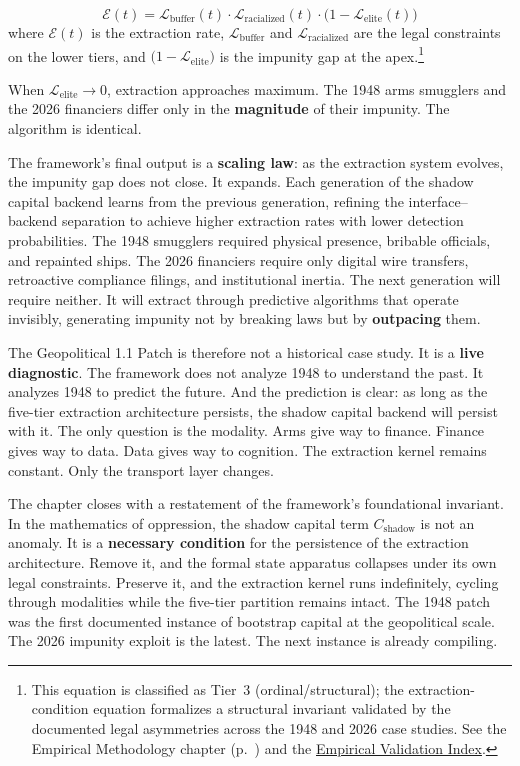 \begin{equation}\label{eq:gp16-extraction-condition}
\mathcal{E}(t) = \mathcal{L}_{\text{buffer}}(t) \cdot \mathcal{L}_{\text{racialized}}(t) \cdot \bigl(1 - \mathcal{L}_{\text{elite}}(t)\bigr)
\end{equation}
where $\mathcal{E}(t)$ is the extraction rate, $\mathcal{L}_{\text{buffer}}$ and $\mathcal{L}_{\text{racialized}}$ are the legal constraints on the lower tiers, and $\bigl(1 - \mathcal{L}_{\text{elite}}\bigr)$ is the impunity gap at the apex.\footnote{This equation is classified as Tier~3 (ordinal/structural); the extraction-condition equation formalizes a structural invariant validated by the documented legal asymmetries across the 1948 and 2026 case studies. See the Empirical Methodology chapter (p.~\pageref{ch:empirical_methodology}) and the \hyperref[app:empirical_index]{Empirical Validation Index}.}

When $\mathcal{L}_{\text{elite}} \rightarrow 0$, extraction approaches maximum. The 1948 arms smugglers and the 2026 financiers differ only in the \textbf{magnitude} of their impunity. The algorithm is identical.

The framework's final output is a \textbf{scaling law}: as the extraction system evolves, the impunity gap does not close. It expands. Each generation of the shadow capital backend learns from the previous generation, refining the interface--backend separation to achieve higher extraction rates with lower detection probabilities. The 1948 smugglers required physical presence, bribable officials, and repainted ships. The 2026 financiers require only digital wire transfers, retroactive compliance filings, and institutional inertia. The next generation will require neither. It will extract through predictive algorithms that operate invisibly, generating impunity not by breaking laws but by \textbf{outpacing} them.

The Geopolitical 1.1 Patch is therefore not a historical case study. It is a \textbf{live diagnostic}. The framework does not analyze 1948 to understand the past. It analyzes 1948 to predict the future. And the prediction is clear: as long as the five-tier extraction architecture persists, the shadow capital backend will persist with it. The only question is the modality. Arms give way to finance. Finance gives way to data. Data gives way to cognition. The extraction kernel remains constant. Only the transport layer changes.


The chapter closes with a restatement of the framework's foundational invariant. In the mathematics of oppression, the shadow capital term $C_{\text{shadow}}$ is not an anomaly. It is a \textbf{necessary condition} for the persistence of the extraction architecture. Remove it, and the formal state apparatus collapses under its own legal constraints. Preserve it, and the extraction kernel runs indefinitely, cycling through modalities while the five-tier partition remains intact. The 1948 patch was the first documented instance of bootstrap capital at the geopolitical scale. The 2026 impunity exploit is the latest. The next instance is already compiling.


